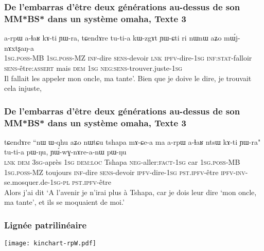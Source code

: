\documentclass[xcolor=table]{beamer}
\newcommand{\ipa}[1]{{\phon #1}} %
\begin{document}
  \begin{frame} 
 \frametitle{De l'embarras d'être deux générations au-dessus de son MM*BS* dans un système omaha, Texte 3} 
  \begin{exe}
\ex 
\gll 
\ipa{a-rpɯ} 	\ipa{a-ɬaʁ} 	\ipa{kɤ-ti} 	\ipa{ɲɯ-ra,} 	\ipa{tɕendɤre} 	\ipa{tu-ti-a} 	\ipa{kɯ-zgɤt} 	\ipa{ɲɯ-ɕti} 	\ipa{ri} 	\ipa{nɯnɯ} 	\ipa{aʑo} 	\ipa{mɯ́j-nɤxtʂaŋ-a} \\
\textsc{1sg.poss}-MB \textsc{1sg.poss}-MZ \textsc{inf}-dire \textsc{sens}-devoir \textsc{lnk} \textsc{ipfv}-dire-\textsc{1sg} \textsc{inf:stat}-falloir \textsc{sens}-être:\textsc{assert} mais \textsc{dem} \textsc{1sg} \textsc{neg:sens}-trouver.juste-\textsc{1sg} \\
\glt Il fallait les appeler  mon oncle, ma tante'. Bien que je doive le dire, je trouvait cela injuste,
\end{exe}
\end{frame}

  \begin{frame} 
 \frametitle{De l'embarras d'être deux générations au-dessus de son MM*BS* dans un système omaha, Texte 3} 
 
 \begin{exe}
\ex 
\gll 
\ipa{tɕendɤre} 	``\ipa{nɯ} 	\ipa{ɯ-qhu} 	\ipa{aʑo} 	\ipa{nɯtɕu} 	\ipa{tshapa} 	\ipa{mɤ-ɕe-a} 	\ipa{ma} 	\ipa{a-rpɯ} 	\ipa{a-ɬaʁ} 	\ipa{ntsɯ} 	\ipa{kɤ-ti} 	\ipa{ɲɯ-ra"} 	\ipa{tu-ti-a} 	\ipa{pɯ-ŋu,} 	\ipa{ɲɯ́-wɣ-nɤre-a-nɯ} 	\ipa{pɯ-ŋu} \\
\textsc{lnk} \textsc{dem} \textsc{3sg}-après \textsc{1sg} \textsc{dem:loc} Tshapa \textsc{neg}-aller:\textsc{fact-1sg} car \textsc{1sg.poss}-MB \textsc{1sg.poss}-MZ toujours \textsc{inf}-dire \textsc{sens}-devoir \textsc{ipfv}-dire-\textsc{1sg} \textsc{pst.ipfv}-être \textsc{ipfv-inv}-se.mosquer.de-\textsc{1sg-pl} \textsc{pst.ipfv}-être \\
\glt Alors j'ai dit `A l'avenir je n'irai plus à Tshapa, car je dois leur dire `mon oncle, ma tante', et ils se moquaient de moi.'
\end{exe}
\end{frame}

  \begin{frame} 
 \frametitle{Lignée patrilinéaire} 
 \texttt{[image: kinchart-rpW.pdf]}  
\end{frame}
\end{document}
